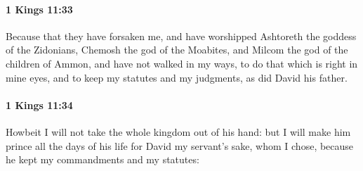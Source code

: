 		\paragraph{1 Kings 11:33} %
			\label{1KINGS-11-33}

			Because that they have forsaken me, and have worshipped Ashtoreth the goddess of the Zidonians, Chemosh the god of the Moabites, and Milcom the god of the children of Ammon, and have not walked in my ways, to do that which is right in mine eyes, and to keep my statutes and my judgments, as did David his father.


		\paragraph{1 Kings 11:34} %
			\label{1KINGS-11-34}

			Howbeit I will not take the whole kingdom out of his hand: but I will make him prince all the days of his life for David my servant’s sake, whom I chose, because he kept my commandments and my statutes:

